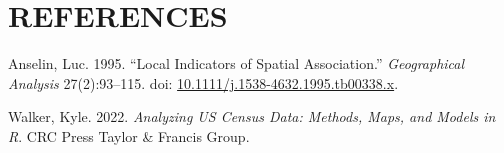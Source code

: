 \documentclass[
]{DissertateCUNY}
\newlength{\cslhangindent}
\newlength{\cslentryspacingunit} %
\newenvironment{CSLReferences}[2] %
 {%
  \setlength{\parindent}{0pt}
  \ifodd #1
  \let\oldpar\par
  \def\par{\hangindent=\cslhangindent\oldpar}
  \fi
  \setlength{\parskip}{#2\cslentryspacingunit}
 }%
 {}
\begin{document}
\fancyhead[R]{\thepage}
\fancyfoot[C]{}

\chapter*{REFERENCES}
\singlespacing
{}

\setlength{\parskip}{6pt}

\noindent

\hypertarget{refs}{}
\begin{CSLReferences}{1}{0}
\leavevmode{}%
Anselin, Luc. 1995. {``Local {Indicators} of {Spatial
Association}.''} \emph{Geographical Analysis}
27(2):93--115. doi:
\href{https://doi.org/10.1111/j.1538-4632.1995.tb00338.x}{10.1111/j.1538-4632.1995.tb00338.x}.

\leavevmode{}%
Walker, Kyle. 2022. \emph{Analyzing {US Census Data}: {Methods}, {Maps},
and {Models} in {R}}. {CRC Press Taylor \& Francis Group}.

\end{CSLReferences}

\clearpage
\end{document}
